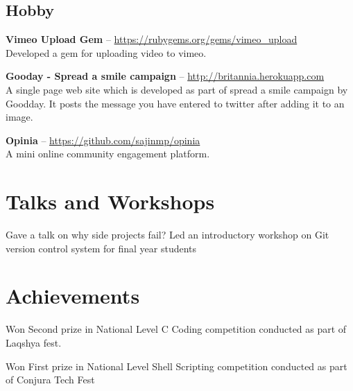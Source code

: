 \documentclass[11pt,a4paper]{moderncv}
\begin{document}
\subsection{Hobby}

\cvlistitem
{\textbf{Vimeo Upload Gem} -- {\small \href{https://rubygems.org/gems/vimeo\_upload}{https://rubygems.org/gems/vimeo\_upload}}
  \\Developed a gem for uploading video to vimeo.
}

\cvlistitem
{\textbf{Gooday - Spread a smile campaign} -- {\small \href{http://britannia.herokuapp.com}{http://britannia.herokuapp.com}}
  \\A single page web site which is developed as part of spread a smile campaign by\\
  Goodday. It posts the message you have entered to twitter after adding it to an\\
  image.
}

\cvlistitem
{\textbf{Opinia} -- {\small \href{https://github.com/sajinmp/opinia}{https://github.com/sajinmp/opinia}}
  \\A mini online community engagement platform.
}




\section{Talks and Workshops}
{Gave a talk on why side projects fail?}
{Led an introductory workshop on Git version control system for final year students} 


\section{Achievements}

{Won Second prize in National Level C Coding competition conducted as part of Laqshya fest.}

{Won First prize in National Level Shell Scripting competition conducted as part of Conjura Tech Fest}


\end{document}
